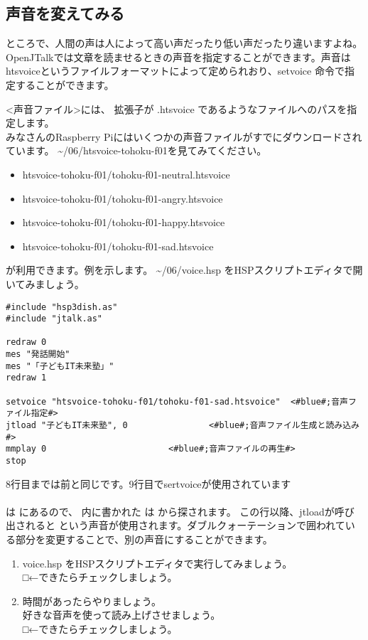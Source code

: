 \subsection{声音を変えてみる}
ところで、人間の声は人によって高い声だったり低い声だったり違いますよね。OpenJTalkでは文章を読ませるときの声音を指定することができます。声音はhtsvoiceというファイルフォーマットによって定められおり、setvoice 命令で指定することができます。\\

<声音ファイル>には、 拡張子が .htsvoice であるようなファイルへのパスを指定します。\\
みなさんのRaspberry Piにはいくつかの声音ファイルがすでにダウンロードされています。  \textasciitilde /06/htsvoice-tohoku-f01を見てみてください。

\begin{itemize}
\item htsvoice-tohoku-f01/tohoku-f01-neutral.htsvoice
\item htsvoice-tohoku-f01/tohoku-f01-angry.htsvoice
\item htsvoice-tohoku-f01/tohoku-f01-happy.htsvoice
\item htsvoice-tohoku-f01/tohoku-f01-sad.htsvoice
\end{itemize}

が利用できます。例を示します。 \textasciitilde /06/voice.hsp をHSPスクリプトエディタで開いてみましょう。\\

\begin{lstlisting}[caption=voice.hsp,label=voice.hsp]
#include "hsp3dish.as"
#include "jtalk.as"

redraw 0
mes "発話開始"
mes "「子どもIT未来塾」"
redraw 1

setvoice "htsvoice-tohoku-f01/tohoku-f01-sad.htsvoice"	<#blue#;音声ファイル指定#>
jtload "子どもIT未来塾", 0				<#blue#;音声ファイル生成と読み込み#>
mmplay 0						<#blue#;音声ファイルの再生#>
stop
\end{lstlisting}

8行目までは前と同じです。9行目でsertvoiceが使用されています\\
\\
 は  にあるので、
 内に書かれた 
は  から探されます。
この行以降、jtloadが呼び出されると 
という声音が使用されます。ダブルクォーテーションで囲われている部分を変更することで、別の声音にすることができます。\\

\begin{tcolorbox}[title=\useOmetoi]
\begin{enumerate}
\item voice.hsp をHSPスクリプトエディタで実行してみましょう。\\□←できたらチェックしましょう。
\item 時間があったらやりましょう。\\好きな音声を使って読み上げさせましょう。\\□←できたらチェックしましょう。
\end{enumerate}
\end{tcolorbox}
